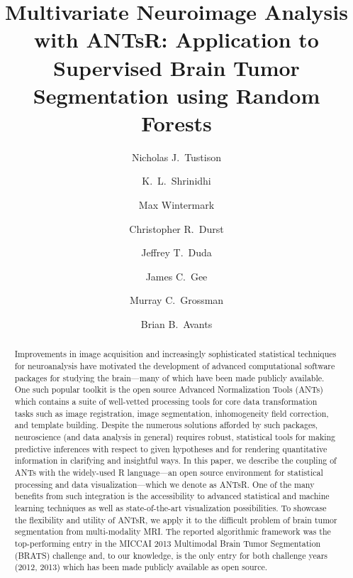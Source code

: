 \documentclass[final,5p,times,twocolumn]{elsarticle}
\begin{document}
\begin{frontmatter}

\title{Multivariate Neuroimage Analysis with ANTsR: Application to Supervised Brain Tumor Segmentation using Random Forests}

\author[label1]{Nicholas J.~Tustison
  }
\author[label2]{K.~L.~Shrinidhi}
\author[label1]{Max Wintermark}
\author[label1]{Christopher R.~Durst}
\author[label2]{Jeffrey T.~Duda}
\author[label1]{James C.~Gee}
\author[label3]{Murray C.~Grossman}
\author[label2]{Brian B.~Avants}
\address[label1]{Department of Radiology and Medical Imaging, University of Virginia, Charlottesville, VA}
\address[label2]{Penn Image Computing and Science Laboratory, 
                 Department of Radiology, University of Pennsylvania,
                Philadelphia, PA}
\address[label3]{Department of Neurology, University of Pennsylvania,
                Philadelphia, PA}



\begin{abstract} 
Improvements in image acquisition and increasingly sophisticated statistical techniques 
for neuroanalysis have motivated the development of advanced computational software 
packages for studying the
brain---many of which
have been made publicly available.  One such popular toolkit is the open source Advanced
Normalization Tools (ANTs) which contains a suite of well-vetted processing tools for
core data transformation tasks such as image registration, image segmentation, 
inhomogeneity field correction, and template building.  Despite the numerous
solutions afforded by such packages, neuroscience (and data analysis in general) requires
robust, statistical tools for making predictive inferences with respect to given hypotheses
and for rendering quantitative information in clarifying and insightful ways.  
In this paper, we describe the
coupling of ANTs with the widely-used R language---an open source environment for 
statistical processing and data visualization---which we denote as ANTsR.  One of the
many benefits from such integration is the accessibility to advanced statistical 
and machine learning techniques as well as state-of-the-art visualization possibilities.  
To showcase the flexibility and utility of ANTsR, we 
apply it to the difficult problem of brain tumor segmentation from multi-modality
MRI.  The reported algorithmic framework was the top-performing entry in the MICCAI 2013 Multimodal 
Brain Tumor Segmentation (BRATS) challenge and, to our knowledge, is the only entry for
both challenge years (2012, 2013) which has been made publicly available as open source.
\end{abstract}


\end{frontmatter}
\end{document}
